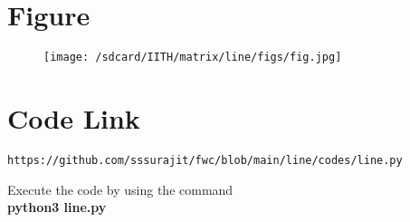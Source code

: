 \documentclass[journal,12pt,twocolumn]{IEEEtran}
\begin{document}
\section{\textbf{Figure}}
\begin{figure}[h]
    \centering
    \texttt{[image: /sdcard/IITH/matrix/line/figs/fig.jpg]}
    \label{fig:my_label}
\end{figure}


\section{\textbf{Code Link}}

\begin{lstlisting}
https://github.com/sssurajit/fwc/blob/main/line/codes/line.py
\end{lstlisting}
Execute the code by using the command\\
\textbf{python3 line.py}
\end{document}
